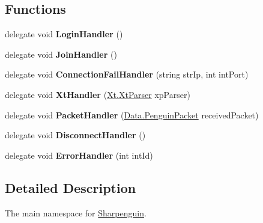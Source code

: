 \subsection*{\-Functions}
\begin{DoxyCompactItemize}
\item 
\hypertarget{namespaceSharpenguin_a3fe182151524c2bb5fac5bc386a00958}{delegate void {\bfseries \-Login\-Handler} ()}\label{namespaceSharpenguin_a3fe182151524c2bb5fac5bc386a00958}

\item 
\hypertarget{namespaceSharpenguin_a5ba375cdd84112abe9c2a5c1ea431730}{delegate void {\bfseries \-Join\-Handler} ()}\label{namespaceSharpenguin_a5ba375cdd84112abe9c2a5c1ea431730}

\item 
\hypertarget{namespaceSharpenguin_aac9861f4e28dcf1d91190fbc8bb3a34a}{delegate void {\bfseries \-Connection\-Fail\-Handler} (string str\-Ip, int int\-Port)}\label{namespaceSharpenguin_aac9861f4e28dcf1d91190fbc8bb3a34a}

\item 
\hypertarget{namespaceSharpenguin_aabe05957554f393f8ac42f3638fbe3d2}{delegate void {\bfseries \-Xt\-Handler} (\hyperlink{classSharpenguin_1_1Xt_1_1XtParser}{\-Xt.\-Xt\-Parser} xp\-Parser)}\label{namespaceSharpenguin_aabe05957554f393f8ac42f3638fbe3d2}

\item 
\hypertarget{namespaceSharpenguin_ab8e8d3abbe4092eff0a110543db5d61f}{delegate void {\bfseries \-Packet\-Handler} (\hyperlink{classSharpenguin_1_1Data_1_1PenguinPacket}{\-Data.\-Penguin\-Packet} received\-Packet)}\label{namespaceSharpenguin_ab8e8d3abbe4092eff0a110543db5d61f}

\item 
\hypertarget{namespaceSharpenguin_a67fd56044a18342181ce6f25b81ee93e}{delegate void {\bfseries \-Disconnect\-Handler} ()}\label{namespaceSharpenguin_a67fd56044a18342181ce6f25b81ee93e}

\item 
\hypertarget{namespaceSharpenguin_aad92c96a7e3460249d9a403dee76dc69}{delegate void {\bfseries \-Error\-Handler} (int int\-Id)}\label{namespaceSharpenguin_aad92c96a7e3460249d9a403dee76dc69}

\end{DoxyCompactItemize}


\subsection{\-Detailed \-Description}
\-The main namespace for \hyperlink{namespaceSharpenguin}{\-Sharpenguin}. 